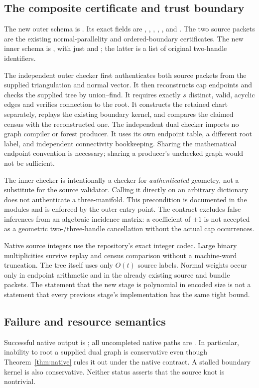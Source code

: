 \subsection{The composite certificate and trust boundary}
The new outer schema is .  Its exact
fields are , , ,
, , and .  The two source packets
are the existing normal-parallelity and ordered-boundary certificates.
The new inner schema is , with just
 and ; the latter is a list of original
two-handle identifiers.

The independent outer checker first authenticates both source packets from
the supplied triangulation and normal vector.  It then reconstructs cap
endpoints and checks the supplied tree by union--find.  It requires exactly
$s$ distinct, valid, acyclic edges and verifies connection to the root.
It constructs the retained chart separately, replays the existing boundary
kernel, and compares the claimed census with the reconstructed one.
The independent dual checker imports no graph compiler or forest producer.
It uses its own endpoint table, a different root label, and independent
connectivity bookkeeping.  Sharing the mathematical endpoint convention
is necessary; sharing a producer's unchecked graph would not be sufficient.

The inner checker is intentionally a checker for \emph{authenticated}
geometry, not a substitute for the source validator.  Calling it directly
on an arbitrary dictionary does not authenticate a three-manifold.  This
precondition is documented in the modules and is enforced by the outer
entry point.  The contract excludes false inferences from an algebraic
incidence matrix: a coefficient of $\pm1$ is not accepted as a geometric
two-/three-handle cancellation without the actual cap occurrences.

Native source integers use the repository's exact integer codec.  Large
binary multiplicities survive replay and census comparison without a
machine-word truncation.  The tree itself uses only $O(t)$ source labels.
Normal weights occur only in endpoint arithmetic and in the already
existing source and bundle packets.  The statement that the new stage is
polynomial in encoded size is not a statement that every previous stage's
implementation has the same tight bound.

\subsection{Failure and resource semantics}
Successful native output is ; all uncompleted native paths
are .  In particular, inability to root a supplied dual
graph is conservative even though Theorem~\ref{thm:native} rules it out
under the native contract.  A stalled boundary kernel is also conservative.
Neither status asserts that the source knot is nontrivial.


